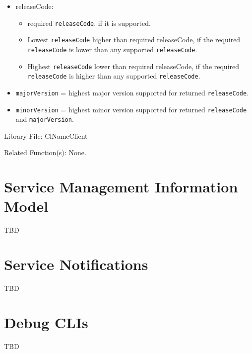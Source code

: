 \begin{flushleft}
\begin{Desc}
\begin{itemize}
\item
releaseCode:
	\begin{itemize}
	\item
	required {\tt{releaseCode}}, if it is supported.
	\item
	Lowest {\tt{releaseCode}} higher than required releaseCode, if the required {\tt{releaseCode}} is lower than any supported {\tt{releaseCode}}.
	\item
	Highest {\tt{releaseCode}} lower than required releaseCode, if the required {\tt{releaseCode}} is higher than any supported {\tt{releaseCode}}.
	\end{itemize}
\item
{\tt{majorVersion}} = highest major version supported for returned {\tt{releaseCode}}.
\item
{\tt{minorVersion}} = highest minor version supported for returned {\tt{releaseCode}} and {\tt{majorVersion}}.
\end{itemize}

\end{Desc}
\begin{Desc}
\item[Library File:]Cl\-Name\-Client\end{Desc}
\begin{Desc}
\item[Related Function(s):]None. \end{Desc}

\chapter{Service Management Information Model}
TBD
\chapter{Service Notifications}
TBD
\chapter{Debug CLIs}
TBD

\end{flushleft}
